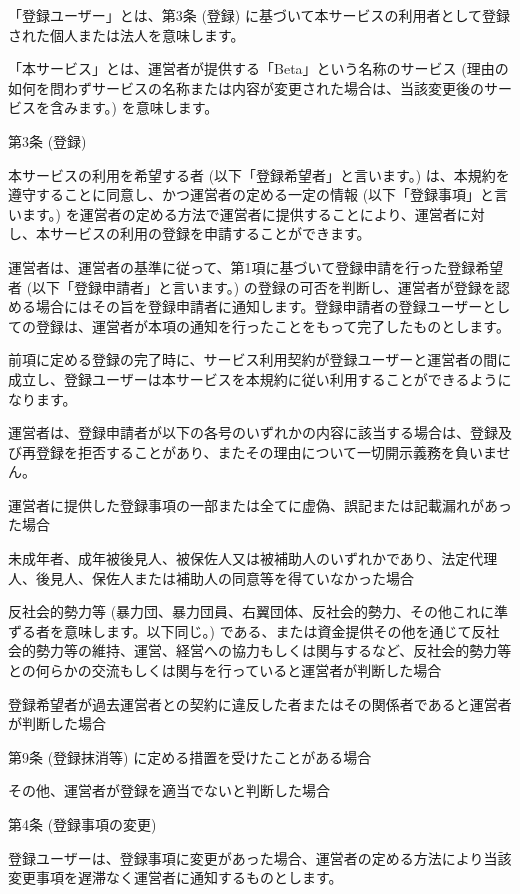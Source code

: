     「登録ユーザー」とは、第3条 (登録) に基づいて本サービスの利用者として登録された個人または法人を意味します。

    「本サービス」とは、運営者が提供する「Beta」という名称のサービス (理由の如何を問わずサービスの名称または内容が変更された場合は、当該変更後のサービスを含みます。) を意味します。

第3条 (登録)

    本サービスの利用を希望する者 (以下「登録希望者」と言います。) は、本規約を遵守することに同意し、かつ運営者の定める一定の情報 (以下「登録事項」と言います。) を運営者の定める方法で運営者に提供することにより、運営者に対し、本サービスの利用の登録を申請することができます。

    運営者は、運営者の基準に従って、第1項に基づいて登録申請を行った登録希望者 (以下「登録申請者」と言います。) の登録の可否を判断し、運営者が登録を認める場合にはその旨を登録申請者に通知します。登録申請者の登録ユーザーとしての登録は、運営者が本項の通知を行ったことをもって完了したものとします。

    前項に定める登録の完了時に、サービス利用契約が登録ユーザーと運営者の間に成立し、登録ユーザーは本サービスを本規約に従い利用することができるようになります。

    運営者は、登録申請者が以下の各号のいずれかの内容に該当する場合は、登録及び再登録を拒否することがあり、またその理由について一切開示義務を負いません。

        運営者に提供した登録事項の一部または全てに虚偽、誤記または記載漏れがあった場合

        未成年者、成年被後見人、被保佐人又は被補助人のいずれかであり、法定代理人、後見人、保佐人または補助人の同意等を得ていなかった場合

        反社会的勢力等 (暴力団、暴力団員、右翼団体、反社会的勢力、その他これに準ずる者を意味します。以下同じ。) である、または資金提供その他を通じて反社会的勢力等の維持、運営、経営への協力もしくは関与するなど、反社会的勢力等との何らかの交流もしくは関与を行っていると運営者が判断した場合

        登録希望者が過去運営者との契約に違反した者またはその関係者であると運営者が判断した場合

        第9条 (登録抹消等) に定める措置を受けたことがある場合

        その他、運営者が登録を適当でないと判断した場合

第4条 (登録事項の変更)

    登録ユーザーは、登録事項に変更があった場合、運営者の定める方法により当該変更事項を遅滞なく運営者に通知するものとします。

